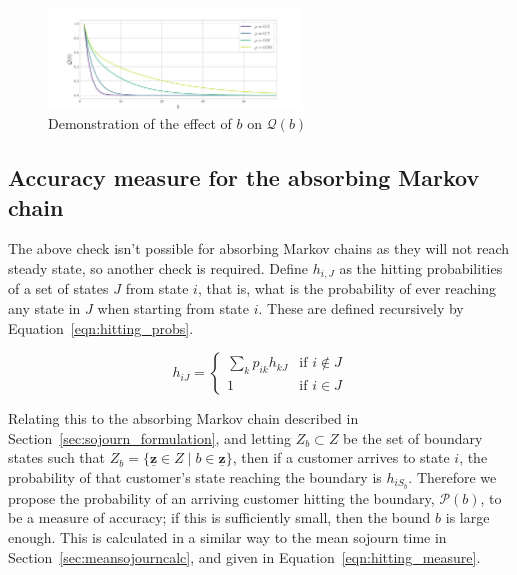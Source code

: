 \documentclass{article}
\begin{document}
\begin{figure}[!htbp]
  \begin{center}
    \includegraphics[width=0.6\textwidth]{img/quotient_check.pdf}
  \end{center}
  \caption{Demonstration of the effect of $b$ on $\mathcal{Q}(b)$}
  \label{fig:ergodic_check}
\end{figure}




\subsection{Accuracy measure for the absorbing Markov chain}\label{sec:absorbing_check}
The above check isn't possible for absorbing Markov chains as they will not
reach steady state, so another check is required. Define $h_{i,J}$ as
the hitting probabilities of a set of states $J$ from state $i$, that is, what
is the probability of ever reaching any state in $J$ when starting from state
$i$. These are defined recursively by Equation~\ref{eqn:hitting_probs}.

\begin{equation}\label{eqn:hitting_probs}
h_{iJ} = \begin{cases}
\sum_k p_{ik} h_{kJ} & \text{if } i \notin J \\
1 & \text{if } i \in J
\end{cases}
\end{equation}

Relating this to the absorbing Markov chain described in
Section~\ref{sec:sojourn_formulation}, and letting $Z_b \subset Z$ be the set of
boundary states such that
$Z_b = \{\underline{\mathbf{z}} \in Z \; | \; b \in \underline{\mathbf{z}}\}$,
then if a customer arrives to state $i$, the probability of that customer's
state reaching the boundary is $h_{iS_b}$. Therefore we propose the probability
of an arriving customer hitting the boundary, $\mathcal{P}(b)$, to be a measure
of accuracy; if this is sufficiently small, then the bound $b$ is large enough.
This is calculated in a similar way to the mean sojourn time in
Section~\ref{sec:meansojourncalc}, and given in Equation~\ref{eqn:hitting_measure}.
\end{document}
